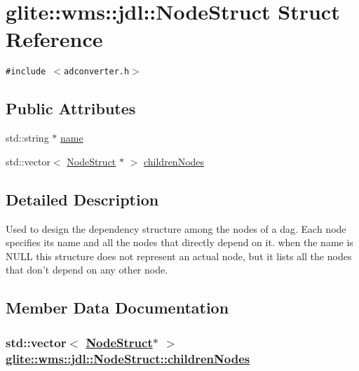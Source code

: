 \hypertarget{structglite_1_1wms_1_1jdl_1_1NodeStruct}{
\section{glite::wms::jdl::Node\-Struct Struct Reference}
\label{structglite_1_1wms_1_1jdl_1_1NodeStruct}
}
{\tt \#include $<$adconverter.h$>$}

\subsection*{Public Attributes}
\begin{CompactItemize}
\item 
std::string $\ast$ \hyperlink{structglite_1_1wms_1_1jdl_1_1NodeStruct_o0}{name}
\item 
std::vector$<$ \hyperlink{structglite_1_1wms_1_1jdl_1_1NodeStruct}{Node\-Struct} $\ast$ $>$ \hyperlink{structglite_1_1wms_1_1jdl_1_1NodeStruct_o1}{children\-Nodes}
\end{CompactItemize}


\subsection{Detailed Description}
Used to design the dependency structure among the nodes of a dag. Each node specifies its name and all the nodes that directly depend on it. when the name is NULL this structure does not represent an actual node, but it lists all the nodes that don't depend on any other node. 



\subsection{Member Data Documentation}
\hypertarget{structglite_1_1wms_1_1jdl_1_1NodeStruct_o1}{
\subsubsection[childrenNodes]{\setlength{\rightskip}{0pt plus 5cm}std::vector$<$ \hyperlink{structglite_1_1wms_1_1jdl_1_1NodeStruct}{Node\-Struct}$\ast$ $>$ \hyperlink{structglite_1_1wms_1_1jdl_1_1NodeStruct_o1}{glite::wms::jdl::Node\-Struct::children\-Nodes}}}
\label{structglite_1_1wms_1_1jdl_1_1NodeStruct_o1}


